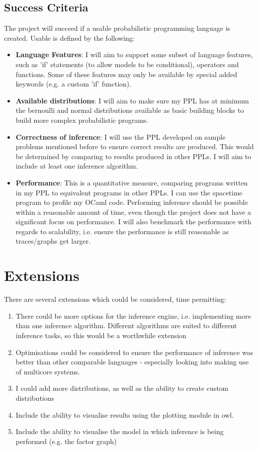 \subsection*{Success Criteria}

The project will succeed if a usable probabilistic programming language is created. Usable is defined by the following:

\begin{itemize}
      \item \textbf{Language Features}: I will aim to support some subset of language features, such as 'if' statements (to allow models to be conditional), operators and functions. Some of these features may only be available by special added keywords (e.g. a custom 'if' function).
      \item \textbf{Available distributions}: I will aim to make sure my PPL has at minimum the bernoulli and normal distributions available as basic building blocks to build more complex probabilistic programs.
      \item \textbf{Correctness of inference}: I will use the PPL developed on sample problems mentioned before to ensure correct results are produced. This would be determined by comparing to results produced in other PPLs. I will aim to include at least one inference algorithm.
      \item \textbf{Performance}: This is a quantitative measure, comparing programs written in my PPL to equivalent programs in other PPLs. I can use the spacetime program to profile my OCaml code. Performing inference should be possible within a reasonable amount of time, even though the project does not have a significant focus on performance. I will also benchmark the performance with regards to scalability, i.e. ensure the performance is still reasonable as traces/graphs get larger.
\end{itemize}

\section*{Extensions}

There are several extensions which could be considered, time permitting:

\begin{enumerate}
      \item There could be more options for the inference engine, i.e. implementing more than one inference algorithm. Different algorithms are suited to different inference tasks, so this would be a worthwhile extension
      \item Optimisations could be considered to ensure the performance of inference was better than other comparable languages - especially looking into making use of multicore systems.
      \item I could add more distributions, as well as the ability to create custom distributions
      \item Include the ability to visualise results using the plotting module in owl.
      \item Include the ability to visualise the model in which inference is being performed (e.g. the factor graph)
\end{enumerate}


